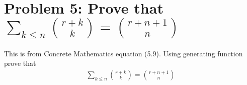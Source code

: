 ﻿\section{Problem 5: Prove that $\sum_{k \leq n} \binom{r+k}{k} = \binom{r+n+1}{n}$}
\label{sec:problem-5:-concrete-mathematics-5.9}
This is from Concrete Mathematics equation (5.9).
Using generating function prove that
\begin{align}
    \sum_{k \leq n} \binom{r+k}{k} = \binom{r+n+1}{n}
    \label{eq:identity-to-prove-problem-5}
\end{align}
